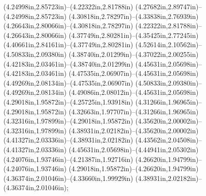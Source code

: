 (4.24998in,2.85723in)--(4.22322in,2.81788in) (4.27682in,2.89747in)--(4.24998in,2.85723in) (4.30818in,2.78297in)--(4.33838in,2.76939in) (4.26643in,2.80066in)--(4.30818in,2.78297in) (4.22322in,2.81788in)--(4.26643in,2.80066in) (4.37749in,2.80281in)--(4.35425in,2.77245in) (4.40661in,2.84161in)--(4.37749in,2.80281in) (4.52614in,2.10562in)--(4.50833in,2.09380in) (4.38740in,2.01299in)--(4.37022in,2.00255in) (4.42183in,2.03461in)--(4.38740in,2.01299in) (4.45631in,2.05698in)--(4.42183in,2.03461in) (4.47535in,2.06907in)--(4.45631in,2.05698in) (4.49269in,2.08134in)--(4.47535in,2.06907in) (4.50833in,2.09380in)--(4.49269in,2.08134in) (4.49086in,2.08012in)--(4.45631in,2.05698in) (4.29018in,1.95872in)--(4.25725in,1.93918in) (4.31266in,1.96965in)--(4.29018in,1.95872in) (4.32663in,1.97707in)--(4.31266in,1.96965in) (4.32316in,1.97899in)--(4.29018in,1.95872in) (4.35620in,2.00002in)--(4.32316in,1.97899in) (4.38931in,2.02182in)--(4.35620in,2.00002in) (4.41327in,2.03336in)--(4.38931in,2.02182in) (4.43562in,2.04508in)--(4.41327in,2.03336in) (4.45631in,2.05698in)--(4.44941in,2.05302in) (4.24076in,1.93746in)--(4.21387in,1.92716in) (4.26620in,1.94799in)--(4.24076in,1.93746in) (4.29018in,1.95872in)--(4.26620in,1.94799in) (4.36374in,2.01046in)--(4.33660in,1.99929in) (4.38931in,2.02182in)--(4.36374in,2.01046in);
